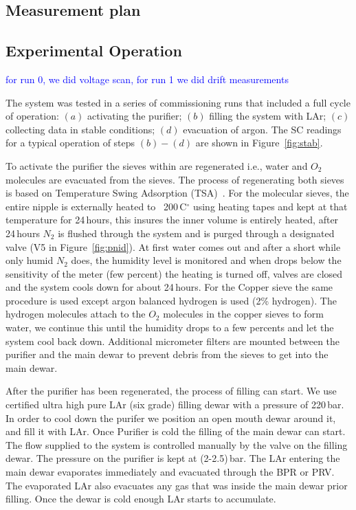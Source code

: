 \documentclass[a4paper,12pt]{article}
\newcommand{\RI}[1]{\textcolor{blue}{#1}}
\begin{document}
\subsection{Measurement plan}


\subsection{Experimental Operation}
\label{sec:ExpOp}


\RI{for run 0, we did voltage scan, for run 1 we did drift measurements}

The system was tested  in a series of commissioning runs that included a full cycle of operation: $(a)$ activating the purifier;  $(b)$ filling the system with LAr; $(c)$ collecting data in stable conditions; $(d)$ evacuation of argon. The SC readings for a typical operation of steps $(b) - (d)$ are shown in Figure~\ref{fig:stab}.

To activate the purifier the sieves within are regenerated i.e., water and $O_2$ molecules are evacuated from the sieves. The process of regenerating both sieves is based on Temperature Swing Adsorption (TSA)~\cite{LeVan1989}. For the molecular sieves, the entire nipple is externally heated to ~200\,C$^{\circ}$ using heating tapes and kept at that temperature for 24\,hours, this insures the inner volume is entirely heated, after 24\,hours $N_2$ is flushed through the system and is purged through a designated valve (V5 in Figure~\ref{fig:pnid}). At first water comes out and after a short while only humid $N_2$ does, the humidity level is monitored and when drops below the sensitivity of the meter (few percent) the heating is turned off, valves are closed and the system cools down for about 24\,hours. For the Copper sieve the same procedure is used except argon balanced hydrogen is used (2\% hydrogen). The hydrogen molecules attach to the $O_2$ molecules in the copper sieves to form water, we continue this until the humidity drops to a few percents and let the system cool back down. Additional micrometer filters are mounted between the purifier and the main dewar to prevent debris from the sieves to get into the main dewar.

After the purifier has been regenerated, the process of filling can start. We use certified ultra high pure LAr (six grade) filling dewar with a pressure of 220\,bar. In order to cool down the purifer we position an open mouth dewar around it, and fill it with LAr. Once Purifier is cold the filling of the main dewar can start. The flow supplied to the system is controlled manually by the valve on the filling dewar. The pressure on the purifier is kept at (2-2.5)\,bar. The LAr entering the main dewar evaporates immediately and evacuated through the BPR or PRV. The evaporated LAr also evacuates any gas that was inside the main dewar prior filling. Once the dewar is cold enough LAr starts to accumulate.
\end{document}
